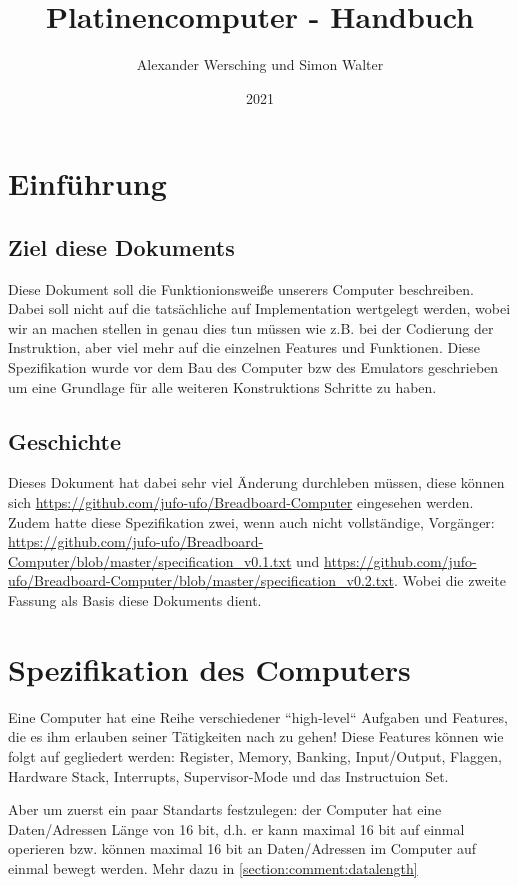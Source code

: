 \documentclass{scrartcl}
\begin{document}
\title{Platinencomputer - Handbuch}
\author{Alexander Wersching und Simon Walter}
\date{2021}
\maketitle
\newpage


\tableofcontents
\newpage

\section{Einführung}
\subsection{Ziel diese Dokuments}
Diese Dokument soll die Funktionionsweiße unserers Computer beschreiben. Dabei soll nicht auf die tatsächliche auf Implementation wertgelegt werden, wobei wir an machen stellen in genau dies tun müssen wie z.B. bei der Codierung der Instruktion, aber viel mehr auf die einzelnen Features und Funktionen. Diese Spezifikation wurde vor dem Bau des Computer bzw des Emulators geschrieben um eine Grundlage für alle weiteren Konstruktions Schritte zu haben. 

\subsection{Geschichte}
Dieses Dokument hat dabei sehr viel Änderung durchleben müssen, diese können sich \url{https://github.com/jufo-ufo/Breadboard-Computer} eingesehen werden. Zudem hatte diese Spezifikation zwei, wenn auch nicht vollständige, Vorgänger: \url{https://github.com/jufo-ufo/Breadboard-Computer/blob/master/specification_v0.1.txt} und \url{https://github.com/jufo-ufo/Breadboard-Computer/blob/master/specification_v0.2.txt}. Wobei die zweite Fassung als Basis diese Dokuments dient.




\section{Spezifikation des Computers}
Eine Computer hat eine Reihe verschiedener ``high-level`` Aufgaben und Features, die es ihm erlauben seiner Tätigkeiten nach zu gehen! 
Diese Features können wie folgt auf gegliedert werden: Register, Memory, Banking, Input/Output, Flaggen, Hardware Stack, Interrupts, Supervisor-Mode und das Instructuion Set.

Aber um zuerst ein paar Standarts festzulegen: der Computer hat eine Daten/Adressen Länge von 16 bit, d.h. er kann maximal 16 bit auf einmal operieren bzw. können maximal 16 bit an Daten/Adressen im Computer auf einmal bewegt werden. Mehr dazu in \autoref{section:comment:datalength}
\end{document}
